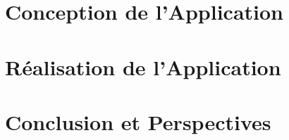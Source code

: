 \documentclass[a4paper,11pt,oneside]{report}
\begin{document}
\newpage

\chapter{Conception de l'Application}

\newpage



\newpage

\chapter{Réalisation de l'Application}

\newpage



\newpage

\chapter*{Conclusion et Perspectives}

\newpage

\renewcommand{\appendixtocname}{Annexes}







\newpage
\end{document}
